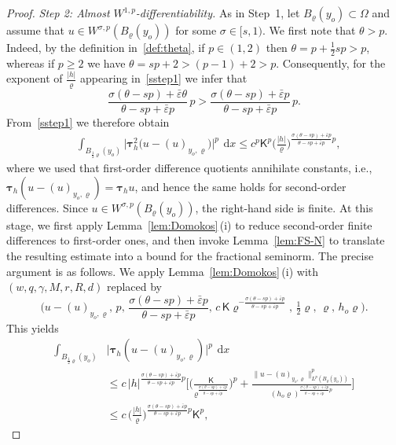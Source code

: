 \documentclass[10pt,letterpaper]{amsart}
\theoremstyle{definition}
\numberwithin{theorem}{section}
\numberwithin{equation}{section}
\newcommand{\1}{\ensuremath{\mathds{1}}}
\newcommand\sfK{{\boldsymbol{\mathsf K}}}
\renewcommand{\epsilon}{\varepsilon}
\renewcommand{\rho}{\varrho}
\renewcommand{\epsilon}{\varepsilon}
\renewcommand{\rho}{\varrho}
\renewcommand{\d}{\:\! \mathrm{d}}
\numberwithin{equation}{section}
\begin{document}
\begin{proof}
\noindent
\textit{Step 2: Almost \(W^{1,p}\)-differentiability.} 
As in Step~1, let \(B_\rho(y_o)\subset\Omega\) and assume that
\(u\in W^{\sigma,p}(B_\rho(y_o))\) for some \(\sigma\in[s,1)\).
We first note that \(\theta>p\).
Indeed, by the definition in~\eqref{def:theta}, if \(p\in(1,2)\) then
\(\theta=p+\tfrac12 sp>p\), whereas if \(p\ge2\) we have
\(\theta=sp+2>(p-1)+2>p\).
Consequently, for the exponent of \(\frac{|h|}{\rho}\) appearing
in~\eqref{sstep1} we infer that
\[
    \frac{\sigma(\theta-sp)+\bar\epsilon\theta}{\theta-sp+\bar\epsilon p}\, p
    >
    \frac{\sigma(\theta-sp)+\bar\epsilon p}{\theta-sp+\bar\epsilon p}\, p .
\]
From~\eqref{sstep1} we therefore obtain
\begin{align*}%
    &\int_{B_{\frac12\rho}(y_o)} \big|\boldsymbol\tau_h^2 \big(u-(u)_{y_o,\rho}\big)\big|^p \, \d x \leq 
    c^p\sfK^p  \Big(\frac{|h|}{\rho}\Big)^{\frac{\sigma(\theta-sp)+\bar\epsilon p}{\theta-sp+\bar\epsilon p} p},
\end{align*}
where we used that first-order difference quotients annihilate constants, i.e.,
\(
\boldsymbol\tau_h (u-(u)_{y_o,\rho})=\boldsymbol\tau_h u
\),
and hence the same holds for second-order differences. Since \(u\in W^{\sigma,p}(B_\rho(y_o))\), the right-hand side is finite.
At this stage, we first apply Lemma~\ref{lem:Domokos}\,(i) to reduce
second-order finite differences to first-order ones, and then invoke
Lemma~\ref{lem:FS-N} to translate the resulting estimate into a bound for
the fractional seminorm.
The precise argument is as follows. We apply Lemma~\ref{lem:Domokos}\,(i) with
$(w,q,\gamma,M,r,R,d)$ replaced by
\[
\bigg( u-(u)_{y_o,\rho}, \,p,\, 
\frac{\sigma(\theta-sp)+\bar\epsilon p}{\theta-sp+\bar\epsilon p}
,\,c\,\sfK\rho^{-\frac{\sigma(\theta-sp)+\bar\epsilon p}{\theta-sp+\bar\epsilon p}},\,\tfrac12\rho, \,\rho, \,h_o\rho\bigg).
\]
This yields
\begin{align*}
    \int_{B_{\frac12\rho}(y_o)} &\big|\boldsymbol\tau_h (u-(u)_{y_o,\rho})\big|^p \, \d x \\
    &\leq c\,|h|^{\frac{\sigma(\theta-sp)+\bar\epsilon p}{\theta-sp+\bar\epsilon p} p} \Bigg[
    \bigg(\frac{\sfK}{\rho^{\frac{\sigma(\theta-sp)+\bar\epsilon p}{\theta-sp+\bar\epsilon p}}}\bigg)^p +
    \frac{ \|u-(u)_{y_o,\rho}\|_{L^p(B_\rho(y_o))}^p}{(h_o\rho)^{\frac{\sigma(\theta-sp)+\bar\epsilon p}{\theta-sp+\bar\epsilon p}p}}
    \Bigg] \\
    &\leq 
    c\, \Big(\frac{|h|}{\rho}\Big)^{\frac{\sigma(\theta-sp)+\bar\epsilon p}{\theta-sp+\bar\epsilon p} p}
    \sfK^p ,
\end{align*}

\end{proof}
\end{document}
